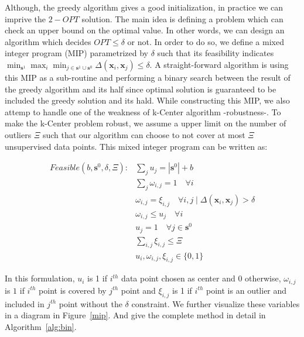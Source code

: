 \documentclass{article}
\begin{document}
Although, the greedy algorithm gives a good initialization, in practice we can imprive the $2-OPT$ solution. The main idea is defining a problem which can check an upper bound on the optimal value. In other words, we can design an algorithm which decides $OPT \leq \delta$ or not. In order to do so, we define a mixed integer program (MIP) parametrized by $\delta$ such that its feasibility indicates $\min_{\mathbf{s}^1} \max_i \min_{j \in \mathbf{s}^1 \cup \mathbf{s}^0} \Delta(\mathbf{x}_i,\mathbf{x}_j) \leq \delta$. A straight-forward algorithm is using this MIP as a sub-routine and performing a binary search between the result of the greedy algorithm and its half since optimal solution is guaranteed to be included the greedy solution and its hald. While constructing this MIP, we also attemp to handle one of the weakness of k-Center algorithm -robustness-. To make the k-Center problem robust, we assume a upper limit on the number of outliers $\Xi$ such that our algorithm can choose to not cover at most $\Xi$ unsupervised data points. This mixed integer program can be written as:

\begin{equation}
\begin{aligned}
Feasible(b,\mathbf{s}^0,\delta, \Xi):  &\sum_j  u_j = |\mathbf{s}^0|+ b \\
&\sum_j \omega_{i,j} = 1 \quad \forall  i \\
   &\omega_{i,j} = \xi_{i,j} \quad  \forall i,j \mid   \Delta(\mathbf{x}_i,\mathbf{x}_j)  > \delta \\
   &\omega_{i,j} \leq u_j \quad \forall  i \\
   &u_j =1 \quad \forall j\in \mathbf{s}^0 \\
   & \sum_{i,j} \xi_{i,j} \leq \Xi \\
   & u_i, \omega_{i,j}, \xi_{i,j} \in \{0,1\}
\end{aligned}
\end{equation}

In this formulation, $u_i$ is 1 if $i^{th}$ data point chosen as center and $0$ otherwise, $\omega_{i,j}$ is $1$ if $i^{th}$ point is covered by $j^{th}$ point and $\xi_{i,j}$ is 1 if $i^{th}$ point is an outlier and included in $j^{th}$ point without the $\delta$ constraint. We further visualize these variables in a diagram in Figure~\ref{mip}. And give the complete method in detail in Algorithm~\ref{alg:bin}. 
\end{document}
